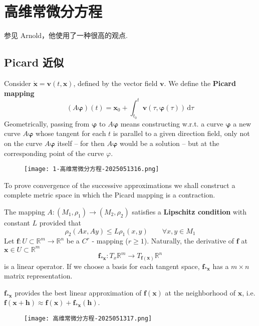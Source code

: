\section{高维常微分方程}

参见 Arnold，他使用了一种很高的观点.

\subsection{Picard 近似}

Consider $\dot{\boldsymbol{x}}=\boldsymbol{v}(t,\boldsymbol{x})$, defined by the vector field $\boldsymbol{v}$. We define the \textbf{Picard mapping}
\[
(A\boldsymbol{\varphi})(t)=\boldsymbol{x}_{0}+\int_{t_0}^{t} \boldsymbol{v}(\tau,\boldsymbol{\varphi}(\tau)) \, \mathrm{d}\tau
\]
Geometrically, passing from $\boldsymbol{\varphi}$ to $A\boldsymbol{\varphi}$ means constructing w.r.t. a curve $\boldsymbol{\varphi}$ a new curve $A\boldsymbol{\varphi}$ whose tangent for each $t$ is parallel to a given direction field, only not on the curve $A\boldsymbol{\varphi}$ itself -- for then $A\boldsymbol{\varphi}$ would be a solution -- but at the corresponding point of the curve $\varphi$.
\begin{figure}[H]
\centering
\texttt{[image: 1-高维常微分方程-2025051316.png]}
\label{}
\end{figure}

To prove convergence of the successive approximations we shall construct a complete metric space in which the Picard mapping is a contraction.

The mapping $A:(M_1,\rho_1)\to (M_2,\rho_2)$ satisfies a \textbf{Lipschitz condition} with constant $L$ provided that
\[
\rho_2(Ax,Ay)\leq L\rho_1(x,y)\qquad \forall x,y\in M_1
\]
Let $\boldsymbol{f}:U\subset \mathbb{R}^{m}\to \mathbb{R}^{n}$ be a $C^{r}$ - mapping ($r\geq1$). Naturally, the derivative of $\boldsymbol{f}$ at $\boldsymbol{x}\in U\subset \mathbb{R}^{m}$
\[
\boldsymbol{f}_{*\boldsymbol{x}}:T_{x}\mathbb{R}^{m}\to T_{\boldsymbol{f}(\boldsymbol{x})}\mathbb{R}^{n}
\]
is a linear operator. If we choose a basis for each tangent space, $\boldsymbol{f}_{*\boldsymbol{x}}$ has a $m\times n$ matrix representation.

\begin{note}
$\boldsymbol{f}_{*\boldsymbol{x}}$ provides the best linear approximation of $\boldsymbol{f}(\boldsymbol{x})$ at the neighborhood of $\boldsymbol{x}$, i.e. $\boldsymbol{f}(\boldsymbol{x}+\boldsymbol{h})\approx \boldsymbol{f}(\boldsymbol{x})+\boldsymbol{f}_{*\boldsymbol{x}}(\boldsymbol{h})$.
\end{note}
\begin{figure}[H]
\centering
\texttt{[image: 高维常微分方程-2025051317.png]}
\label{}
\end{figure}

